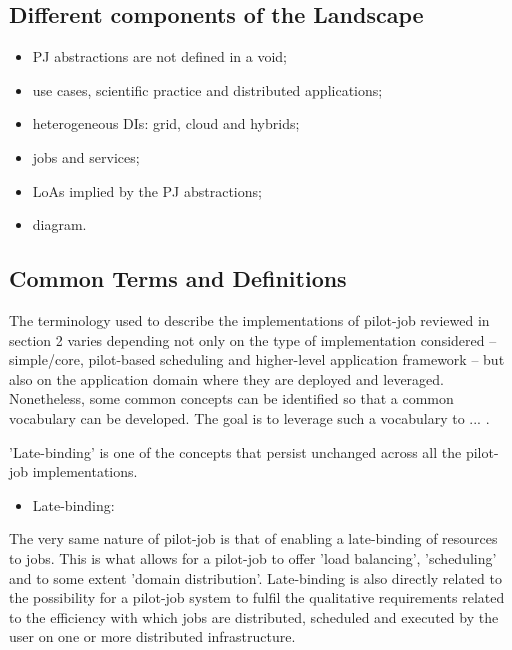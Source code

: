 \documentclass{sig-alternate}
\begin{document}
\subsection{Different components of the Landscape}


\begin{itemize}
        \item PJ abstractions are not defined in a void;
	\item use cases, scientific practice and distributed applications;
        \item heterogeneous DIs: grid, cloud and hybrids;
	\item jobs and services;
        \item LoAs implied by the PJ abstractions;
	\item diagram.
\end{itemize}

\subsection{Common Terms and Definitions}


The terminology used to describe the implementations of pilot-job reviewed in
section 2 varies depending not only on the type of implementation considered --
simple/core, pilot-based scheduling and higher-level application framework --
but also on the application domain where they are deployed and leveraged.
Nonetheless, some common concepts can be identified so that a common vocabulary
can be developed. The goal is to leverage such a vocabulary to ...
.

'Late-binding' is one of the concepts that persist unchanged across all the
pilot-job implementations. 
\begin{itemize}
        \item Late-binding: 
\end{itemize}

The very same nature of pilot-job is that of enabling a late-binding of
resources to jobs. This is what allows for a pilot-job to offer 'load
balancing', 'scheduling' and to some extent 'domain distribution'. Late-binding
is also directly related to the possibility for a pilot-job system to fulfil
the qualitative requirements related to the efficiency with which jobs are
distributed, scheduled and executed by the user on one or more distributed
infrastructure. 
\end{document}
